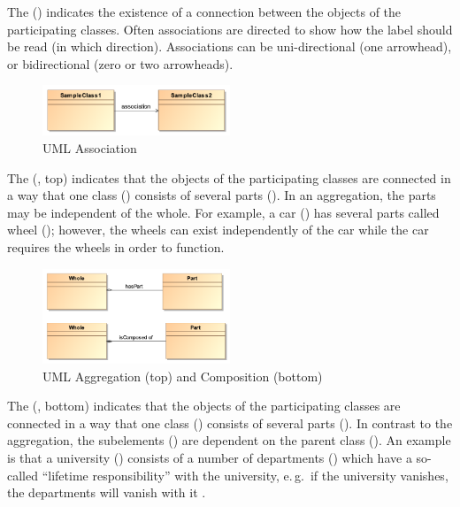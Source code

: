 The  () indicates the existence of a connection between the objects of the participating classes. Often associations are directed to show how the label should be read (in which direction). Associations can be uni-directional (one arrowhead), or bidirectional (zero or two arrowheads).  
\begin{figure}[h]
\centering
\includegraphics[width=0.5\textwidth]{images/pdf/umlAssociation}
\caption{UML Association}
\label{fig:umlAssociation}
\end{figure}

 
The  (, top) indicates that the objects of the participating classes are connected in a way that one class () consists of several parts (). In an aggregation, the parts may be independent of the whole. For example, a car ()  has several parts called wheel (); however, the wheels can exist independently of the car while the car requires the wheels in order to function.
\begin{figure}[h]
\centering
\includegraphics[width=0.5\textwidth]{images/pdf/umlAggregation}
\caption{UML Aggregation (top) and Composition (bottom)}
\label{fig:umlAggregation}
\end{figure}

The  (, bottom) indicates that the objects of the participating classes are connected in a way that one class () consists of several parts (). In contrast to the aggregation, the subelements () are dependent on the parent class (). An example is that a university () consists of a number of departments () which have a so-called ``lifetime responsibility'' with the university, e.\,g.\ if the university vanishes,  the departments will vanish with it \citep{Bel03}.

